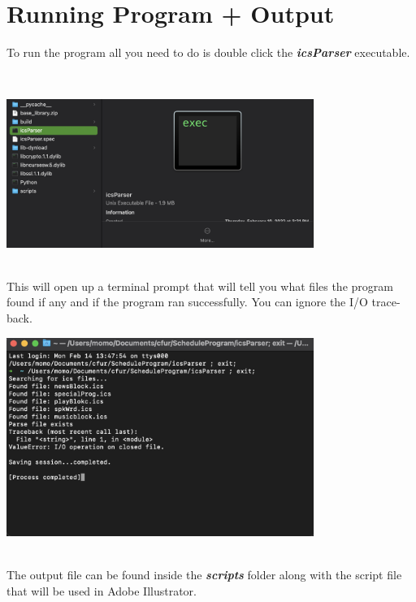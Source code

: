 \section*{Running Program + Output}
To run the program all you need to do is double click the \textbf{\textit{icsParser}} executable.

\\
\begin{center}
   \includegraphics[width=100mm]{images/exe.png} 
\end{center}
\\
This will open up a terminal prompt that will tell you what files the program found if any and if the program ran successfully. You can ignore the I/O trace-back.
\\
\begin{center}
   \includegraphics[width=100mm]{images/terminal.png}
\end{center}
\\
The output file can be found inside the \textbf{\textit{scripts}} folder along with the script file that will be used in Adobe Illustrator.
